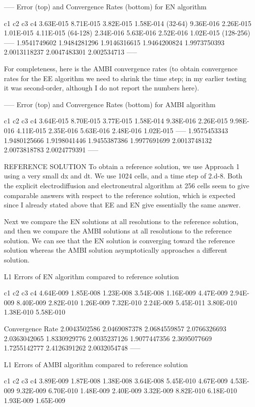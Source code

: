 \documentclass[final]{siamltex}
\begin{document}
-----
Error (top) and Convergence Rates (bottom) for EN algorithm

c1		c2		c3		c4
3.63E-015	8.71E-015	3.82E-015	1.58E-014  (32-64)
9.36E-016	2.26E-015	1.01E-015	4.11E-015  (64-128)
2.34E-016	5.63E-016	2.52E-016	1.02E-015  (128-256)
-----
1.9541749602	1.9484281296	1.9146316615	1.9464200824
1.9973750393	2.0013118237	2.0047483301	2.002534713
-----

For completeness, here is the AMBI convergence rates (to obtain convergence 
rates for the EE algorithm we need to shrink the time step; in my earlier 
testing it was second-order, although I do not report the numbers here).

-----
Error (top) and Convergence Rates (bottom) for AMBI algorithm

c1		c2		c3		c4
3.64E-015	8.70E-015	3.77E-015	1.58E-014
9.38E-016	2.26E-015	9.98E-016	4.11E-015
2.35E-016	5.63E-016	2.48E-016	1.02E-015
-----			
1.9575453343	1.9480125666	1.9198041446	1.9455387386
1.9977691699	2.0013748132	2.0073818783	2.0024779391
-----

REFERENCE SOLUTION
To obtain a reference solution, we use Approach 1 using a very small dx and dt.
We use 1024 cells, and a time step of 2.d-8.  Both the explicit electrodiffusion
and electroneutral algorithm at 256 cells seem to give comparable answers with
respect to the reference solution, which is expected since I already stated above
that EE and EN give essentially the same answer.

Next we compare the EN solutions at all resolutions to the reference solution, and then
we compare the AMBI solutions at all resolutions to the reference solution.
We can see that the EN solution is converging toward the reference solution whereas the
AMBI solution asymptotically approaches a different solution.

L1 Errors of EN algorithm compared to reference solution

c1		c2		c3		c4
4.64E-009	1.85E-008	1.23E-008	3.54E-008
1.16E-009	4.47E-009	2.94E-009	8.40E-009
2.82E-010	1.26E-009	7.32E-010	2.24E-009
5.45E-011	3.80E-010	1.38E-010	5.58E-010
			
Convergence Rate			
2.0043502586	2.0469087378	2.0684559857	2.0766326693
2.0363042065	1.8330929776	2.0035237126	1.9077447356
2.3695077669	1.7255142777	2.4126391262	2.0032054748
-----

L1 Errors of AMBI algorithm compared to reference solution

c1		c2		c3		c4
3.89E-009	1.87E-008	1.38E-008	3.64E-008
5.45E-010	4.67E-009	4.53E-009	9.32E-009
6.70E-010	1.48E-009	2.40E-009	3.32E-009
8.82E-010	6.18E-010	1.93E-009	1.65E-009
			
\end{document}
